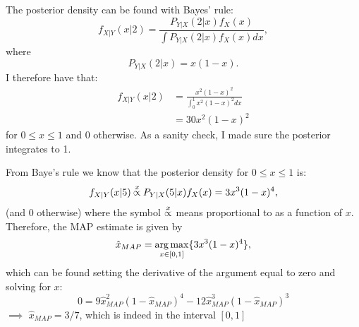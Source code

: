 \begin{problem}{1} The posterior density can be found with Bayes' rule:
\begin{equation*}
f_{X|Y}(x|2) = \frac{P_{Y|X}(2|x)f_X(x)}{\int P_{Y|X}(2|x)f_X(x)dx},
\end{equation*}
where
\begin{equation*}
P_{Y|X}(2|x) = x(1-x).
\end{equation*}
I therefore have that:
\begin{align*}
f_{X|Y}(x|2) &=\frac{x^2(1-x)^2}{\int_0^1 x^2(1-x)^2 dx} \\
& = 30 x^2(1-x)^2
\end{align*}
for $0\le x \le1$ and 0 otherwise.  As a sanity check, I made sure the posterior integrates to 1.

\end{problem}

\begin{problem}{2} From Baye's rule we know that the posterior density for $0\le x\le 1$ is:
\begin{equation*}
f_{X|Y}(x|5) \propof{x} P_{Y|X}(5|x)f_X(x) = 3x^3(1-x)^4,
\end{equation*}
(and 0 otherwise) where the symbol $\propof{x}$ means proportional to as a function of $x$.  Therefore, the MAP estimate is given by
\begin{equation*}
\hat x_{MAP} = \operatorname*{arg\,max}_{x \in [0, 1]}  \{3x^3(1-x)^4 \},
\end{equation*}
which can be found setting the derivative of the argument equal to zero and solving for $x$:
\begin{equation*}
0 = 9\hat x_{MAP}^2(1-\hat x_{MAP})^4-12\hat x_{MAP}^3(1-\hat x_{MAP})^3
\end{equation*}
$\implies$ $\hat x_{MAP} = 3/7$, which is indeed in the interval $[0, 1]$


\end{problem}

